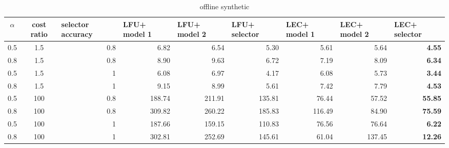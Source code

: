 \begin{table}[ht]
\begin{center}
\begin{tabular}{ ccp{3.5em}p{3.2em}p{3.2em}p{3.2em}p{3.2em}p{3.2em}p{3.2em} }
  \toprule
  $\alpha$ & cost ratio & selector accuracy & LFU+ model 1 & LFU+ model 2 & LFU+ selector & LEC+ model 1 & LEC+ model 2 & LEC+ selector \\ 
  \midrule
  0.5 & 1.5 & \multicolumn{1}{r}{ 0.8 } & \multicolumn{1}{r}{ 6.82 } & \multicolumn{1}{r}{ 6.54 } & \multicolumn{1}{r}{ 5.30 } & \multicolumn{1}{r}{ 5.61 } & \multicolumn{1}{r}{ 5.64 } & \multicolumn{1}{r}{ \textbf{ 4.55 } } \\ 
  0.8 & 1.5 & \multicolumn{1}{r}{ 0.8 } & \multicolumn{1}{r}{ 8.90 } & \multicolumn{1}{r}{ 9.63 } & \multicolumn{1}{r}{ 6.72 } & \multicolumn{1}{r}{ 7.19 } & \multicolumn{1}{r}{ 8.09 } & \multicolumn{1}{r}{ \textbf{ 6.34 } } \\ 
  \midrule
  0.5 & 1.5 & \multicolumn{1}{r}{ 1 } & \multicolumn{1}{r}{ 6.08 } & \multicolumn{1}{r}{ 6.97 } & \multicolumn{1}{r}{ 4.17 } & \multicolumn{1}{r}{ 6.08 } & \multicolumn{1}{r}{ 5.73 } & \multicolumn{1}{r}{ \textbf{ 3.44 } } \\ 
  0.8 & 1.5 & \multicolumn{1}{r}{ 1 } & \multicolumn{1}{r}{ 9.15 } & \multicolumn{1}{r}{ 8.99 } & \multicolumn{1}{r}{ 5.61 } & \multicolumn{1}{r}{ 7.42 } & \multicolumn{1}{r}{ 7.79 } & \multicolumn{1}{r}{ \textbf{ 4.53 } } \\ 
  \midrule
  0.5 & 100 & \multicolumn{1}{r}{ 0.8 } & \multicolumn{1}{r}{ 188.74 } & \multicolumn{1}{r}{ 211.91 } & \multicolumn{1}{r}{ 135.81 } & \multicolumn{1}{r}{ 76.44 } & \multicolumn{1}{r}{ 57.52 } & \multicolumn{1}{r}{ \textbf{ 55.85 } } \\ 
  0.8 & 100 & \multicolumn{1}{r}{ 0.8 } & \multicolumn{1}{r}{ 309.82 } & \multicolumn{1}{r}{ 260.22 } & \multicolumn{1}{r}{ 185.83 } & \multicolumn{1}{r}{ 116.49 } & \multicolumn{1}{r}{ 84.90 } & \multicolumn{1}{r}{ \textbf{ 75.59 } } \\ 
  \midrule
  0.5 & 100 & \multicolumn{1}{r}{ 1 } & \multicolumn{1}{r}{ 187.66 } & \multicolumn{1}{r}{ 159.15 } & \multicolumn{1}{r}{ 110.83 } & \multicolumn{1}{r}{ 76.56 } & \multicolumn{1}{r}{ 76.64 } & \multicolumn{1}{r}{ \textbf{ 6.22 } } \\ 
  0.8 & 100 & \multicolumn{1}{r}{ 1 } & \multicolumn{1}{r}{ 302.81 } & \multicolumn{1}{r}{ 252.69 } & \multicolumn{1}{r}{ 145.61 } & \multicolumn{1}{r}{ 61.04 } & \multicolumn{1}{r}{ 137.45 } & \multicolumn{1}{r}{ \textbf{ 12.26 } } \\ 
  \bottomrule
\end{tabular}
\end{center}
\caption{offline synthetic}
\label{tab:offline_synthetic}
\end{table}
